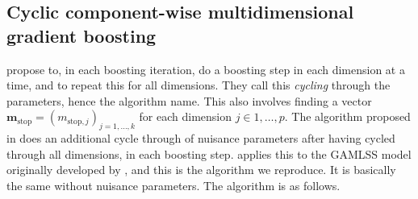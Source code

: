 \subsection{Cyclic component-wise multidimensional gradient boosting}
\citet{schmid} propose to, in each boosting iteration, do a boosting step in each dimension at a time, and to repeat this for all dimensions. They call this \textit{cycling} through the parameters, hence the algorithm name. This also involves finding a vector $\mathbf{m}_{\text{stop}}=(m_{\text{stop},j})_{j=1,\ldots,k}$ for each dimension $j\in1,\ldots,p$. The algorithm proposed in \citet{schmid} does an additional cycle through of nuisance parameters after having cycled through all dimensions, in each boosting step. \citet{gamboostlss-paper} applies this to the GAMLSS model originally developed by \citet{gamlss}, and this is the algorithm we reproduce. It is basically the same without nuisance parameters. The algorithm is as follows.
